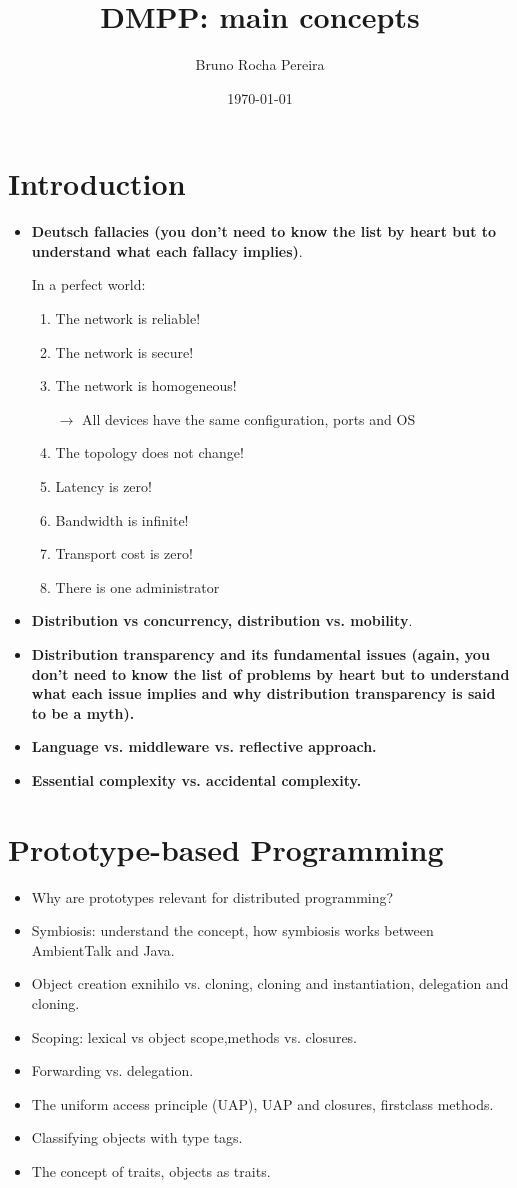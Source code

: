\documentclass[a4paper]{report}
\title{DMPP: main concepts}
\author{Bruno Rocha Pereira}
\date{\today}
\begin{document}
\maketitle
\chapter{Introduction}
\begin{itemize}
  \item \textbf{Deutsch fallacies (you don’t need to know the list by heart but to understand what
  each fallacy implies)}.
  
  In a perfect world:
  \begin{enumerate}
	\item The network is reliable!
    \item The network is secure!
    \item The network is homogeneous!
    
	$\rightarrow $ All devices have the same configuration, ports and OS
    \item The topology does not change!
    \item Latency is zero!
    \item Bandwidth is infinite!
    \item Transport cost is zero!
    \item There is one administrator
\end{enumerate}
  \item \textbf{Distribution vs concurrency, distribution vs. mobility}.
  \item \textbf{Distribution transparency and its fundamental issues (again, you don’t need to know
  the list of problems by heart but to understand what each issue implies and why
  distribution transparency is said to be a myth).}
  \item \textbf{Language vs. middleware vs. reflective approach.}
  \item \textbf{Essential complexity vs. accidental complexity.}
\end{itemize}

\chapter{Prototype-based Programming}
\begin{itemize}
  \item Why are prototypes relevant for distributed programming?
  \item  Symbiosis: understand the concept, how symbiosis works between AmbientTalk and
  Java.
  \item Object creation exnihilo vs. cloning, cloning and instantiation, delegation and cloning.
  \item Scoping: lexical vs object scope,methods vs. closures.
  \item Forwarding vs. delegation.
  \item The uniform access principle (UAP), UAP and closures, firstclass methods.
  \item Classifying objects with type tags.
  \item The concept of traits, objects as traits.
\end{itemize}
\end{document}
